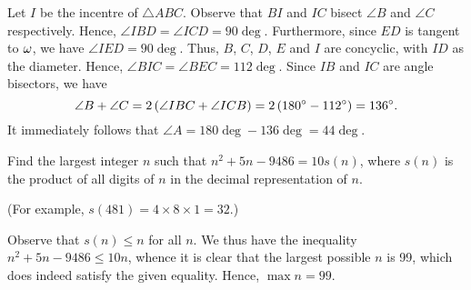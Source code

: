 \begin{center}
\end{center}
\begin{solution*}
    Let $I$ be the incentre of $\triangle ABC$. Observe that $BI$ and $IC$ bisect $\angle B$ and $\angle C$ respectively. Hence, $\angle IBD = \angle ICD = 90\deg$. Furthermore, since $ED$ is tangent to $\omega$, we have $\angle IED = 90\deg$. Thus, $B$, $C$, $D$, $E$ and $I$ are concyclic, with $ID$ as the diameter. Hence, $\angle BIC = \angle BEC = 112\deg$. Since $IB$ and $IC$ are angle bisectors, we have \[\angle B + \angle C = 2 \left( \angle IBC + \angle ICB \right) = 2 \left( 180^{\circ} - 112^{\circ} \right) = 136^{\circ}.\] It immediately follows that $\angle A = 180\deg - 136\deg = 44\deg$.
\end{solution*}

\begin{question}[99]\label{A::2022-O-1-16}
    Find the largest integer $n$ such that $n^2 + 5n - 9486 = 10s(n)$, where $s(n)$ is the product of all digits of $n$ in the decimal representation of $n$.
    
    \noindent (For example, $s(481) = 4 \times 8 \times 1 = 32.$)
\end{question}
\begin{solution*}
    Observe that $s(n) \leq n$ for all $n$. We thus have the inequality $n^2 + 5n - 9486 \leq 10 n$, whence it is clear that the largest possible $n$ is 99, which does indeed satisfy the given equality. Hence, $\max n = 99$.
\end{solution*}

